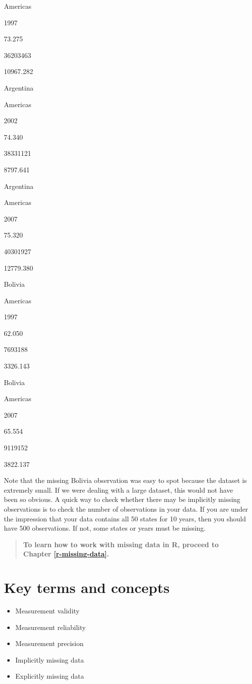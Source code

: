 \documentclass[
]{book}
\providecommand{\tightlist}{%
  \setlength{\itemsep}{0pt}\setlength{\parskip}{0pt}}
\newenvironment{learncheck}%
{%
  \par\vspace{\baselineskip}\noindent 
  \color{Exercise}\begin{itshape}%
  \par\vspace{\baselineskip}\noindent\ignorespaces 
}%
{%
  \end{itshape}\ignorespacesafterend 
}
\begin{document}
Americas

1997

73.275

36203463

10967.282

Argentina

Americas

2002

74.340

38331121

8797.641

Argentina

Americas

2007

75.320

40301927

12779.380

Bolivia

Americas

1997

62.050

7693188

3326.143

Bolivia

Americas

2007

65.554

9119152

3822.137

Note that the missing Bolivia observation was easy to spot because the dataset is extremely small. If we were dealing with a large dataset, this would not have been so obvious. A quick way to check whether there may be implicitly missing observations is to check the number of observations in your data. If you are under the impression that your data contains all 50 states for 10 years, then you should have 500 observations. If not, some states or years must be missing.

\begin{quote}
\textbf{To learn how to work with missing data in R, proceed to Chapter \ref{r-missing-data}.}
\end{quote}

\hypertarget{kt2}{%
\section{Key terms and concepts}\label{kt2}}

\begin{learncheck}
\begin{itemize}
\tightlist
\item
  Measurement validity
\item
  Measurement reliability
\item
  Measurement precision
\item
  Implicitly missing data
\item
  Explicitly missing data
\end{itemize}
\end{learncheck}
\end{document}
